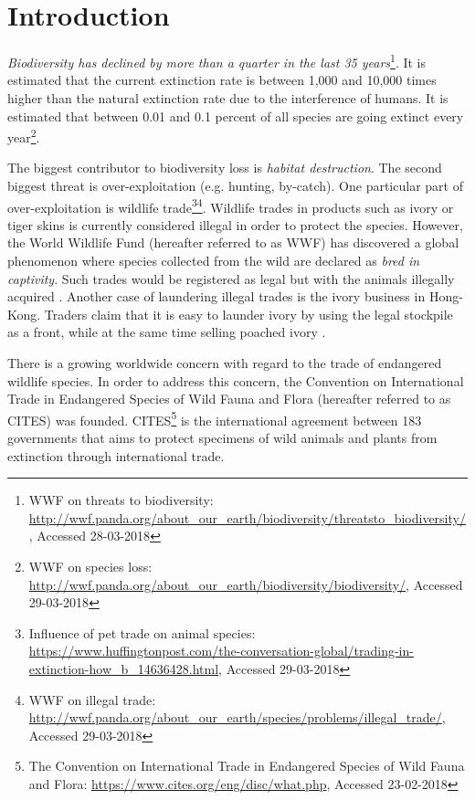 \section{Introduction}
\textit{Biodiversity has declined by more than a quarter in the last 35 years}\footnote{WWF on threats to biodiversity: \url{http://wwf.panda.org/about_our_earth/biodiversity/threatsto_biodiversity/}, Accessed 28-03-2018}. It is estimated that the current extinction rate is between 1,000 and 10,000 times higher than the natural extinction rate due to the interference of humans. It is estimated that between 0.01 and 0.1 percent of all species are going extinct every year\footnote{WWF on species loss: \url{http://wwf.panda.org/about_our_earth/biodiversity/biodiversity/}, Accessed 29-03-2018}.

The biggest contributor to biodiversity loss is \textit{habitat destruction}. The second biggest threat is over-exploitation (e.g. hunting, by-catch). One particular part of over-exploitation is wildlife trade\footnote{Influence of pet trade on animal species: \url{https://www.huffingtonpost.com/the-conversation-global/trading-in-extinction-how_b_14636428.html}, Accessed 29-03-2018}\footnote{WWF on illegal trade: \url{http://wwf.panda.org/about_our_earth/species/problems/illegal_trade/}, Accessed 29-03-2018}. Wildlife trades in products such as ivory or tiger skins is currently considered illegal in order to protect the species. However, the World Wildlife Fund (hereafter referred to as WWF) has discovered a global phenomenon where species collected from the wild are declared as \textit{bred in captivity}. Such trades would be registered as legal but with the animals illegally acquired \cite{Nijman2015,TrafficWWF}. Another case of laundering illegal trades is the ivory business in Hong-Kong. Traders claim that it is easy to launder ivory by using the legal stockpile as a front, while at the same time selling poached ivory \cite{Lo2015}. 

There is a growing worldwide concern with regard to the trade of endangered wildlife species. In order to address this concern, the Convention on International Trade in Endangered Species of Wild Fauna and Flora (hereafter referred to as CITES) was founded. CITES\footnote {The Convention on International Trade in Endangered Species of Wild Fauna and Flora: \url{https://www.cites.org/eng/disc/what.php}, Accessed 23-02-2018} is the international agreement between 183 governments that aims to protect specimens of wild animals and plants from extinction through international trade. 

